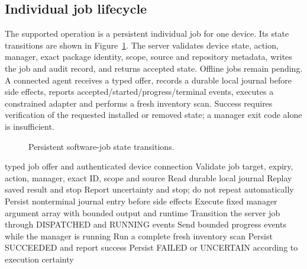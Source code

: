 \documentclass[12pt,a4paper]{report}
\begin{document}
\subsection{Individual job lifecycle}
The supported operation is a persistent individual job for one device. Its
state transitions are shown in Figure~\ref{fig:software-job-lifecycle}. The
server validates device state, action, manager, exact package identity, scope,
source and repository metadata, writes the job and audit record, and returns
accepted state. Offline jobs remain pending. A connected agent receives a
typed offer, records a durable local journal before side effects, reports
accepted/started/progress/terminal events, executes a constrained adapter and
performs a fresh inventory scan. Success requires verification of the
requested installed or removed state; a manager exit code alone is
insufficient.

\begin{figure}[H]
\centering
{}
\caption{Persistent software-job state transitions.}
\label{fig:software-job-lifecycle}
\end{figure}

\begin{algorithm}[H]
\caption{Validated software job execution}
\label{alg:software-job}
\begin{algorithmic}[1]
\Require typed job offer and authenticated device connection
\State Validate job target, expiry, action, manager, exact ID, scope and source
\State Read durable local journal
  \State Replay saved result and stop
  \State Report uncertainty and stop; do not repeat automatically
\EndIf
\State Persist nonterminal journal entry before side effects
\State Execute fixed manager argument array with bounded output and runtime
\State Transition the server job through DISPATCHED and RUNNING events
\State Send bounded progress events while the manager is running
\State Run a complete fresh inventory scan
\State Persist SUCCEEDED and report success
\Else
  \State Persist FAILED or UNCERTAIN according to execution certainty
\EndIf
\end{algorithmic}
\end{algorithm}
\end{document}
